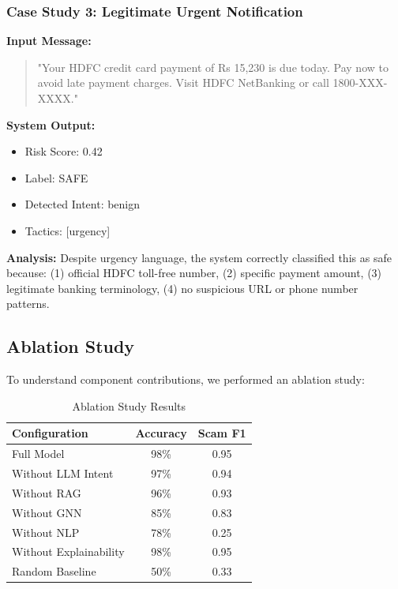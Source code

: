 \subsubsection{Case Study 3: Legitimate Urgent Notification}

\textbf{Input Message:}
\begin{quote}
"Your HDFC credit card payment of Rs 15,230 is due today. Pay now to avoid late payment charges. Visit HDFC NetBanking or call 1800-XXX-XXXX."
\end{quote}

\textbf{System Output:}
\begin{itemize}
    \item Risk Score: 0.42
    \item Label: SAFE
    \item Detected Intent: benign
    \item Tactics: [urgency]
\end{itemize}

\textbf{Analysis:}
Despite urgency language, the system correctly classified this as safe because: (1) official HDFC toll-free number, (2) specific payment amount, (3) legitimate banking terminology, (4) no suspicious URL or phone number patterns.

\subsection{Ablation Study}

To understand component contributions, we performed an ablation study:

\begin{table}[h]
\centering
\caption{Ablation Study Results}
\label{tab:ablation}
\begin{tabular}{lcc}
\toprule
\textbf{Configuration} & \textbf{Accuracy} & \textbf{Scam F1} \\
\midrule
Full Model & 98\% & 0.95 \\
Without LLM Intent & 97\% & 0.94 \\
Without RAG & 96\% & 0.93 \\
Without GNN & 85\% & 0.83 \\
Without NLP & 78\% & 0.25 \\
Without Explainability & 98\% & 0.95 \\
\midrule
Random Baseline & 50\% & 0.33 \\
\bottomrule
\end{tabular}
\end{table}

